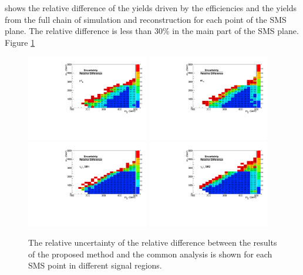 shows the relative difference of the yields driven by the
efficiencies and the yields from the full chain of simulation and reconstruction for each point of the SMS plane. The relative
difference is less than 30\% in the main part of the SMS plane. Figure  \ref{fig:RelativeUncertainty} 
\begin{figure}[!Hhtb]
\centering
\includegraphics[width=0.475\textwidth,keepaspectratio=true]{ModelTesting/RelativeUncertaintymuTau.pdf}
\includegraphics[width=0.475\textwidth,keepaspectratio=true]{ModelTesting/RelativeUncertaintyeleTau.pdf}
\includegraphics[width=0.475\textwidth,keepaspectratio=true]{ModelTesting/RelativeUncertaintyTauTauBin1.pdf}
\includegraphics[width=0.475\textwidth,keepaspectratio=true]{ModelTesting/RelativeUncertaintyTauTauBin2.pdf}
\caption{The relative uncertainty of the relative difference between the results of the proposed method and the common analysis is shown for each SMS point in different signal regions.}
\label{fig:RelativeUncertainty}
\end{figure}
